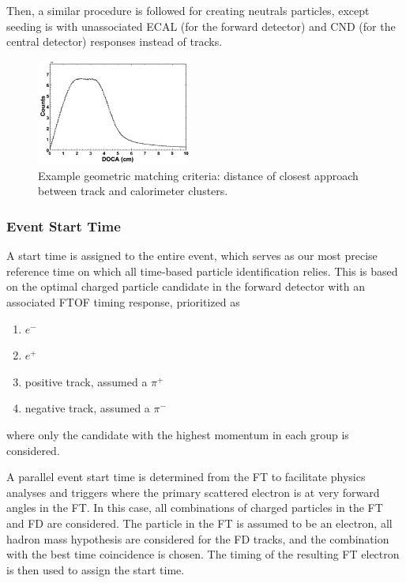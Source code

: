 Then, a similar procedure is followed for creating neutrals particles, except seeding is with unassociated ECAL (for the forward detector) and CND (for the central detector) responses instead of tracks.

\begin{figure}
\centering
\includegraphics[width=0.45\textwidth,height=0.2\textheight]{pics/pcal-doca.png}
\caption{Example geometric matching criteria:  distance of closest approach between track and calorimeter clusters.\label{fig:ebmatch}}
\end{figure}

\subsubsection{Event Start Time}
A start time is assigned to the entire event, which serves as our most precise reference time on which all time-based particle identification relies.  This is based on the optimal charged particle candidate in the forward detector with an associated FTOF timing response, prioritized as
\begin{enumerate}
    \item $e^-$
    \item $e^+$
    \item positive track, assumed a $\pi^+$
    \item negative track, assumed a $\pi^-$
\end{enumerate}
where only the candidate with the highest momentum in each group is considered.

A parallel event start time is determined from the FT to facilitate physics analyses and triggers where the primary scattered electron is at very forward angles in the FT.  In this case, all combinations of charged particles in the FT and FD are considered.  The particle in the FT is assumed to be an electron, all hadron mass hypothesis are considered for the FD tracks, and the combination with the best time coincidence is chosen.  The timing of the resulting FT electron is then used to assign the start time.


